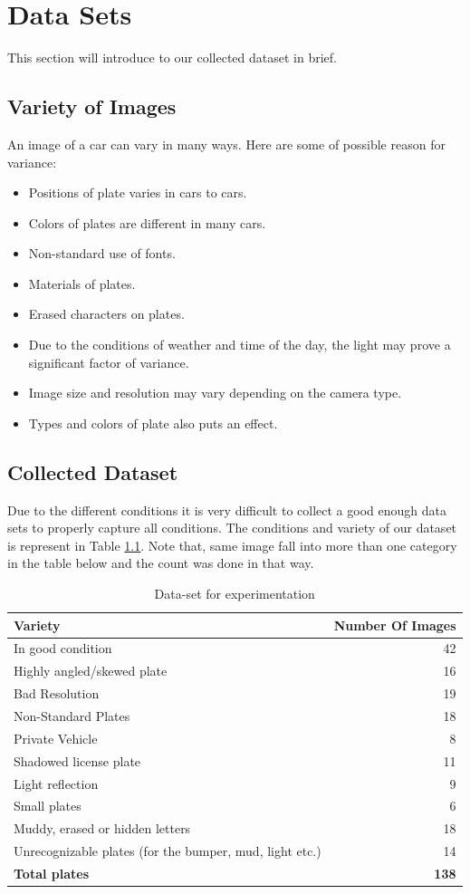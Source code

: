 \documentclass{standalone}
\begin{document}
\chapter{Data Sets}
This section will introduce to our collected dataset in brief. 

\section{Variety of Images}
An image of a car can vary in many ways. Here are some of possible reason for variance:
\begin{itemize}
    \item Positions of plate varies in cars to cars.
    \item Colors of plates are different in many cars.
    \item Non-standard use of fonts.
    \item Materials of plates.
    \item Erased characters on plates.
    \item Due to the conditions of weather and time of the day, the light may prove a significant factor of variance.
    \item Image size and resolution may vary depending on the camera type.
    \item Types and colors of plate also puts an effect.
\end{itemize}

\section{Collected Dataset}
Due to the different conditions it is very difficult to collect a good enough data sets to properly capture all conditions. The conditions and variety of our dataset is represent in Table \ref{table:Variety}. Note that, same image fall into more than one category in the table below and the count was done in that way. 

\begin{table}[hb]
    \centering
    \begin{tabular}{|l|r|}
    \hline
    {\bf Variety}  &  {\bf Number Of Images} \\ 
    \hline 
    In good condition &  42 \\ 
    Highly angled/skewed plate & 16 \\
    Bad Resolution & 19 \\ 
    Non-Standard Plates &  18\\    
    Private Vehicle & 8 \\
    Shadowed license plate & 11 \\    
    Light reflection & 9 \\
    Small plates & 6\\
    Muddy, erased or hidden letters & 18 \\
    Unrecognizable plates (for the bumper, mud, light etc.) & 14  \\
    \hline
    {\bf Total plates} & {\bf 138} \\
    \hline
    \end{tabular}
    \caption{Data-set for experimentation}
    \label{table:Variety}
\end{table}
\end{document}

